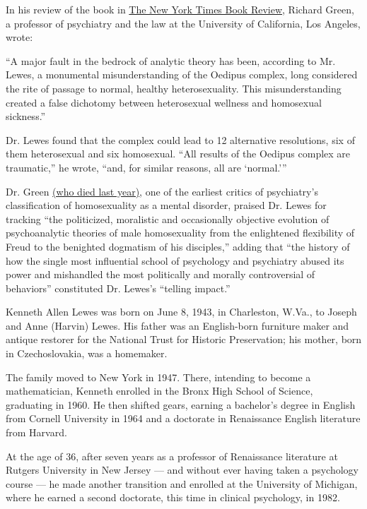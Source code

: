 In his review of the book in
\href{https://www.nytimes.com/1988/12/11/books/navigating-the-straits-of-oedipus.html}{The
New York Times Book Review}, Richard Green, a professor of psychiatry
and the law at the University of California, Los Angeles, wrote:

``A major fault in the bedrock of analytic theory has been, according to
Mr. Lewes, a monumental misunderstanding of the Oedipus complex, long
considered the rite of passage to normal, healthy heterosexuality. This
misunderstanding created a false dichotomy between heterosexual wellness
and homosexual sickness.''

Dr. Lewes found that the complex could lead to 12 alternative
resolutions, six of them heterosexual and six homosexual. ``All results
of the Oedipus complex are traumatic,'' he wrote, ``and, for similar
reasons, all are `normal.'''

Dr. Green
\href{https://www.nytimes.com/2019/04/17/obituaries/dr-richard-green-dead.html}{(who
died last year)}, one of the earliest critics of psychiatry's
classification of homosexuality as a mental disorder, praised Dr. Lewes
for tracking ``the politicized, moralistic and occasionally objective
evolution of psychoanalytic theories of male homosexuality from the
enlightened flexibility of Freud to the benighted dogmatism of his
disciples,'' adding that ``the history of how the single most
influential school of psychology and psychiatry abused its power and
mishandled the most politically and morally controversial of behaviors''
constituted Dr. Lewes's ``telling impact.''

Kenneth Allen Lewes was born on June 8, 1943, in Charleston, W.Va., to
Joseph and Anne (Harvin) Lewes. His father was an English-born furniture
maker and antique restorer for the National Trust for Historic
Preservation; his mother, born in Czechoslovakia, was a homemaker.

The family moved to New York in 1947. There, intending to become a
mathematician, Kenneth enrolled in the Bronx High School of Science,
graduating in 1960. He then shifted gears, earning a bachelor's degree
in English from Cornell University in 1964 and a doctorate in
Renaissance English literature from Harvard.

At the age of 36, after seven years as a professor of Renaissance
literature at Rutgers University in New Jersey --- and without ever
having taken a psychology course --- he made another transition and
enrolled at the University of Michigan, where he earned a second
doctorate, this time in clinical psychology, in 1982.

